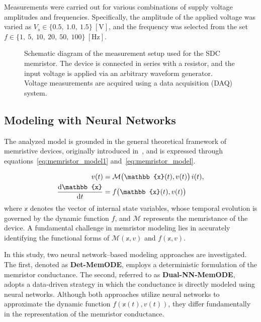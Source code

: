 \documentclass[11pt, oneside]{article}
\newcommand{\der}{{\rm d}}
\newcommand{\M}{\mathcal{M}}
\newcommand{\ua}{v}
\newcommand{\ia}{i}
\begin{document}
Measurements were carried out for various combinations of supply voltage amplitudes and frequencies. Specifically, the amplitude of the applied voltage was varied as $V_s \in \{0.5,\ 1.0,\ 1.5\}~\mathrm{[V]}$, and the frequency was selected from the set $f \in \{1,\ 5,\ 10,\ 20,\ 50,\ 100\}~\mathrm{[Hz]}$.


\begin{figure}[H]
    \centering
    \resizebox{0.5\linewidth}{!}{%
        }
    \vspace{-0.5in}
    \caption{Schematic diagram of the measurement setup used for the SDC memristor. The device is connected in series with a resistor, and the input voltage is applied via an arbitrary waveform generator. Voltage measurements are acquired using a data acquisition (DAQ) system.}
    \label{fig:memristor_setup}
\end{figure}

\subsection{Modeling with Neural Networks}
The analyzed model is grounded in the general theoretical framework of memristive devices, originally introduced in~\cite{Chua1976}, and is expressed through equations~\eqref{eq:memristor_model1} and~\eqref{eq:memristor_model}.


\newcommand{\xvec}{\mathbb{x}}
\begin{align}
    \label{eq:memristor_model1}
    \ua(t)                    & = \M \big(\xvec(t),\ua(t)\big) \, \ia(t), \\
    \label{eq:memristor_model}
    \frac{\der \xvec}{\der t} & = f\big(\xvec(t),\ua(t)\big)
\end{align}
where $\xvec$ denotes the vector of internal state variables, whose temporal evolution is governed by the dynamic function $f$, and $\M$ represents the memristance of the device. A fundamental challenge in memristor modeling lies in accurately identifying the functional forms of $\M(\xvec,\ua)$ and $f(\xvec,\ua)$.

In this study, two neural network–based modeling approaches are investigated. The first, denoted as \textbf{Det-MemODE}, employs a deterministic formulation of the memristor conductance. The second, referred to as \textbf{Dual-NN-MemODE}, adopts a data-driven strategy in which the conductance is directly modeled using neural networks. Although both approaches utilize neural networks to approximate the dynamic function $f(\xvec(t), \ua(t))$, they differ fundamentally in the representation of the memristor conductance.
\end{document}
